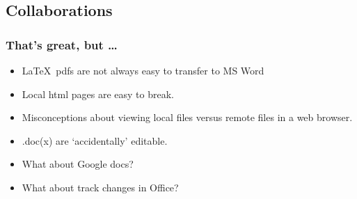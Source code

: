 \documentclass[t]{beamer}\usepackage[]{graphicx}\usepackage[]{color}
\begin{document}
\subsection{Collaborations}
\begin{frame}[fragile]
  \frametitle{That's great, but \ldots}

  \begin{itemize}
    \item \LaTeX\ pdfs are not always easy to transfer to MS Word
    \item Local html pages are easy to break.
    \item Misconceptions about viewing local files versus remote files in a web
      browser.
    \item .doc(x) are `accidentally' editable.  %
  \end{itemize}

  \begin{itemize}
    \item What about Google docs?
    \item What about track changes in Office?
  \end{itemize}

\end{frame}

\end{document}
